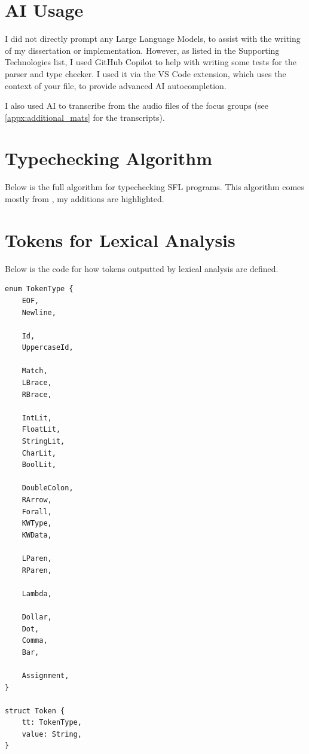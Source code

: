 
\appendix

\chapter{AI Usage}
\label{appx:ai_prompt}

I did not directly prompt any Large Language Models, to assist with the writing of my dissertation or implementation. However, as listed in the Supporting Technologies list, I used GitHub Copilot to help with writing some tests for the parser and type checker. I used it via the VS Code extension, which uses the context of your file, to provide advanced AI autocompletion.

I also used AI to transcribe from the audio files of the focus groups (see \ref{appx:additional_mats} for the transcripts).







\chapter{Typechecking Algorithm}
Below is the full algorithm for typechecking SFL programs. This algorithm comes mostly from \cite{completebidir}, my additions are highlighted. 






% 



\chapter{Tokens for Lexical Analysis}
\label{appx:tokens}
Below is the code for how tokens outputted by lexical analysis are defined. 
\begin{lstlisting}
enum TokenType {
    EOF,
    Newline,

    Id,
    UppercaseId,

    Match,
    LBrace,
    RBrace,

    IntLit,
    FloatLit,
    StringLit,
    CharLit,
    BoolLit,

    DoubleColon,
    RArrow,
    Forall,
    KWType,
    KWData,

    LParen,
    RParen,

    Lambda,

    Dollar,
    Dot,
    Comma,
    Bar,

    Assignment,
}

struct Token {
    tt: TokenType,
    value: String,
}
\end{lstlisting}

